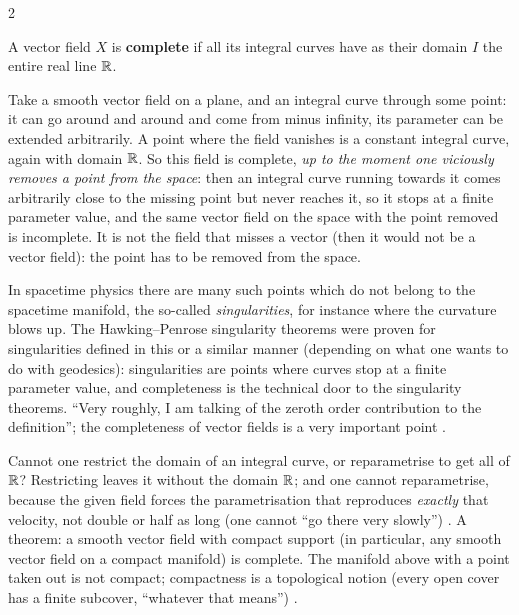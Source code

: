 \begin{paracol}{2}
\begin{definition}\label{def:c11-complete}
A vector field $X$ is \textbf{complete} if all its integral curves have as their domain $I$ the entire real line $\mathbb{R}$.
\end{definition}
\begin{example}\label{ex:c11-incomplete}
Take a smooth vector field on a plane, and an integral curve through some point: it can go around and around and come from minus infinity, its parameter can be extended arbitrarily. A point where the field vanishes is a constant integral curve, again with domain $\mathbb{R}$. So this field is complete, \emph{up to the moment one viciously removes a point from the space}: then an integral curve running towards it comes arbitrarily close to the missing point but never reaches it, so it stops at a finite parameter value, and the same vector field on the space with the point removed is incomplete. It is not the field that misses a vector (then it would not be a vector field): the point has to be removed from the space.
\end{example}
\begin{aside}[Singularities]
In spacetime physics there are many such points which do not belong to the spacetime manifold, the so-called \emph{singularities}, for instance where the curvature blows up. The Hawking--Penrose singularity theorems were proven for singularities defined in this or a similar manner (depending on what one wants to do with geodesics): singularities are points where curves stop at a finite parameter value, and completeness is the technical door to the singularity theorems. ``Very roughly, I am talking of the zeroth order contribution to the definition''; the completeness of vector fields is a very important point .
\end{aside}
\begin{coursenote}
Cannot one restrict the domain of an integral curve, or reparametrise to get all of $\mathbb{R}$? Restricting leaves it without the domain $\mathbb{R}$; and one cannot reparametrise, because the given field forces the parametrisation that reproduces \emph{exactly} that velocity, not double or half as long (one cannot ``go there very slowly'')
.
A theorem: a smooth vector field with compact support (in particular, any smooth vector field on a compact manifold) is complete. The manifold above with a point taken out is not compact; compactness is a topological notion (every open cover has a finite subcover, ``whatever that means'') .
\end{coursenote}


\end{paracol}
